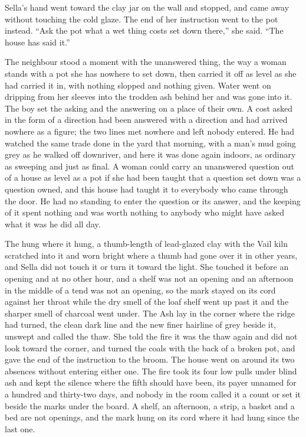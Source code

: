 Sella's hand went toward the clay jar on the wall and stopped, and came away without touching the cold glaze. The end of her instruction went to the pot instead. “Ask the pot what a wet thing costs set down there,” she said. “The house has said it.”

The neighbour stood a moment with the unanswered thing, the way a woman stands with a pot she has nowhere to set down, then carried it off as level as she had carried it in, with nothing slopped and nothing given. Water went on dripping from her sleeves into the trodden ash behind her and was gone into it. The boy set the asking and the answering on a place of their own. A cost asked in the form of a direction had been answered with a direction and had arrived nowhere as a figure; the two lines met nowhere and left nobody entered. He had watched the same trade done in the yard that morning, with a man's mud going grey as he walked off downriver, and here it was done again indoors, as ordinary as sweeping and just as final. A woman could carry an unanswered question out of a house as level as a pot if she had been taught that a question set down was a question owned, and this house had taught it to everybody who came through the door. He had no standing to enter the question or its answer, and the keeping of it spent nothing and was worth nothing to anybody who might have asked what it was he did all day.

\scenebreak

The  hung where it hung, a thumb-length of lead-glazed clay with the Vail kiln scratched into it and worn bright where a thumb had gone over it in other years, and Sella did not touch it or turn it toward the light. She touched it before an opening and at no other hour, and a shelf was not an opening and an afternoon in the middle of a tend was not an opening, so the mark stayed on its cord against her throat while the dry smell of the loaf shelf went up past it and the sharper smell of charcoal went under. The Ash lay in the corner where the ridge had turned, the clean dark line and the new finer hairline of grey beside it, unswept and called the thaw. She told the fire it was the thaw again and did not look toward the corner, and turned the coals with the back of a broken pot, and gave the end of the instruction to the broom. The house went on around its two absences without entering either one. The fire took its four low pulls under blind ash and kept the silence where the fifth should have been, its payer unnamed for a hundred and thirty-two days, and nobody in the room called it a count or set it beside the marks under the board. A shelf, an afternoon, a strip, a basket and a bed are not openings, and the mark hung on its cord where it had hung since the last one.

